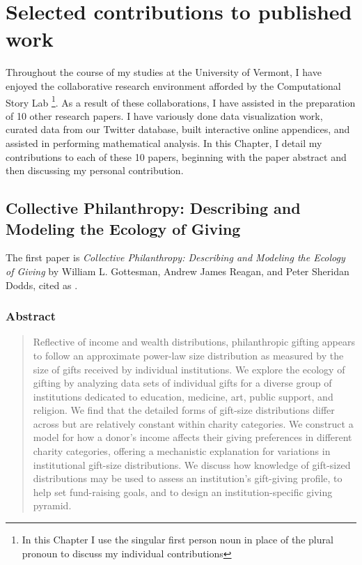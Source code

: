 \chapter{Selected contributions to published work}
\label{chap:contributions}

Throughout the course of my studies at the University of Vermont,
I have enjoyed the collaborative research environment
afforded by the Computational Story Lab \footnote{In this Chapter I use the singular first person noun in place of the plural pronoun to discuss my individual contributions}.
As a result of these collaborations, I have assisted in the preparation of 10 other research papers.
I have variously done data visualization work, curated data from our Twitter database, built interactive online appendices, and assisted in performing mathematical analysis.
In this Chapter, I detail my contributions to each of these 10 papers, beginning with the paper abstract and then discussing my personal contribution.


\pagebreak

\section{Collective Philanthropy: Describing and Modeling the Ecology of Giving}

The first paper is \textit{Collective Philanthropy: Describing and Modeling the Ecology of Giving} by William L. Gottesman, Andrew James Reagan, and Peter Sheridan Dodds, cited as \cite{gottesman2014collective}.

\subsection{Abstract}
\begin{quote}
  Reflective of income and wealth distributions,
  philanthropic gifting appears to follow an approximate power-law size distribution as measured by the size of gifts received by individual institutions.
We explore the ecology of gifting by analyzing data sets of individual gifts for a diverse group of institutions dedicated to education, medicine, art, public support, and religion.
We find that the detailed forms of gift-size distributions differ across but are relatively constant within charity categories.
We construct a model for how a donor's income affects their giving preferences in different charity categories, offering a mechanistic explanation for variations in institutional gift-size distributions.
We discuss how knowledge of gift-sized distributions may be used to assess an institution's gift-giving profile, to help set fund-raising goals, and to design an institution-specific giving pyramid.
\end{quote}

